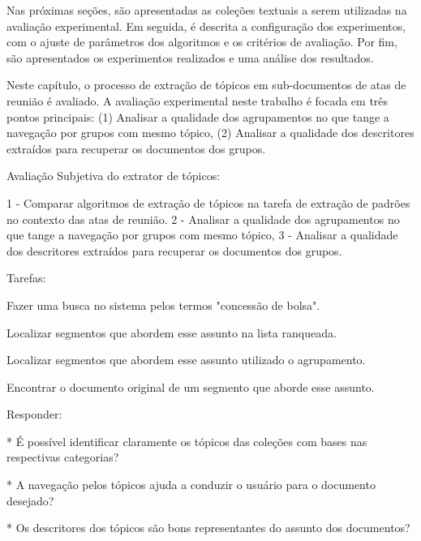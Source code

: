 Nas próximas seções, são apresentadas as coleções textuais a serem utilizadas na avaliação experimental. Em seguida, é descrita a configuração dos experimentos, com o ajuste de parâmetros dos algoritmos e os critérios de avaliação. Por fim, são apresentados os experimentos realizados e uma análise dos resultados.





Neste capítulo, o processo de extração de tópicos em sub-documentos de atas de reunião é avaliado. A avaliação experimental neste trabalho é focada em três pontos principais: 
(1) Analisar a qualidade dos agrupamentos no que tange a navegação por grupos com mesmo tópico, 
(2) Analisar a qualidade dos descritores extraídos para recuperar os documentos dos grupos.























Avaliação Subjetiva do extrator de tópicos:

1 - Comparar algoritmos de extração de tópicos na tarefa de extração de padrões no contexto
das atas de reunião. 
2 - Analisar a qualidade dos agrupamentos no que tange a navegação por grupos com mesmo tópico, 
3 - Analisar a qualidade dos descritores extraídos para recuperar os documentos dos grupos.


Tarefas:

Fazer uma busca no sistema pelos termos "concessão de bolsa".

Localizar segmentos que abordem esse assunto na lista ranqueada.

Localizar segmentos que abordem esse assunto utilizado o agrupamento.

Encontrar o documento original de um segmento que aborde esse assunto.

Responder:


* É possível identificar claramente os tópicos das coleções com bases nas respectivas categorias?


* A navegação pelos tópicos ajuda a conduzir o usuário para o documento desejado?


* Os descritores dos tópicos são bons representantes do assunto dos documentos?


